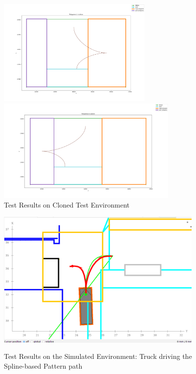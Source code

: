 \begin{figure}[H]
    \centering
    \begin{minipage}{0.45\textwidth}
        \centering
        \includegraphics[width=3in]{images/Chap2/spline_split.png} %
    \end{minipage}
    \begin{minipage}{0.45\textwidth}
        \centering
        \includegraphics[width=3.5in]{images/Chap2/spline_split_posY.png} %
    \end{minipage}
    \caption{Test Results on Cloned Test Environment}
    \label{Test_clone}
\end{figure}

\begin{figure}[H]
    \begin{center}
        \includegraphics[width=4in]{images/Chap2/Pattern_spline_simulation_3_driving.png}\\
        \caption{Test Results on the Simulated Environment: Truck driving the Spline-based Pattern path}
        \label{driving}
        \end{center}    
\end{figure}

